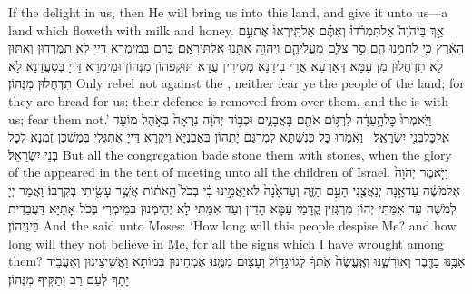 {If the \lord\space delight in us, then He will bring us into this land, and give it unto us—a land which floweth with milk and honey.}{}
{אַ֣ךְ בַּיהֹוָה֮ אַל\maqqaf תִּמְרֹ֒דוּ֒ וְאַתֶּ֗ם אַל\maqqaf תִּֽירְאוּ֙ אֶת\maqqaf עַ֣ם הָאָ֔רֶץ כִּ֥י לַחְמֵ֖נוּ הֵ֑ם סָ֣ר צִלָּ֧ם מֵעֲלֵיהֶ֛ם וַֽיהֹוָ֥ה אִתָּ֖נוּ אַל\maqqaf תִּירָאֻֽם׃}
{בְּרַם בְּמֵימְרָא דַּייָ לָא תִמְרְדוּן וְאַתּוּן לָא תִדְחֲלוּן מִן עַמָּא דְּאַרְעָא אֲרֵי בִידַנָא מְסִירִין עֲדָא תּוּקְפְהוֹן מִנְּהוֹן וּמֵימְרָא דַּייָ בְּסַעֲדַנָא לָא תִדְחֲלוּן מִנְּהוֹן׃}
{Only rebel not against the \lord, neither fear ye the people of the land; for they are bread for us; their defence is removed from over them, and the \lord\space is with us; fear them not.’}{}
{וַיֹּֽאמְרוּ֙ כׇּל\maqqaf הָ֣עֵדָ֔ה לִרְגּ֥וֹם אֹתָ֖ם בָּאֲבָנִ֑ים וּכְב֣וֹד יְהֹוָ֗ה נִרְאָה֙ בְּאֹ֣הֶל מוֹעֵ֔ד אֶֽל\maqqaf כׇּל\maqqaf בְּנֵ֖י יִשְׂרָאֵֽל׃ \petucha }
{וַאֲמַרוּ כָּל כְּנִשְׁתָּא לְמִרְגַּם יָתְהוֹן בְּאַבְנַיָּא וִיקָרָא דַּייָ אִתְגְּלִי בְּמַשְׁכַּן זִמְנָא לְכָל בְּנֵי יִשְׂרָאֵל׃}
{But all the congregation bade stone them with stones, when the glory of the \lord\space appeared in the tent of meeting unto all the children of Israel.}{}
{וַיֹּ֤אמֶר יְהֹוָה֙ אֶל\maqqaf מֹשֶׁ֔ה עַד\maqqaf אָ֥נָה יְנַאֲצֻ֖נִי הָעָ֣ם הַזֶּ֑ה וְעַד\maqqaf אָ֙נָה֙ לֹא\maqqaf יַאֲמִ֣ינוּ בִ֔י בְּכֹל֙ הָֽאֹת֔וֹת אֲשֶׁ֥ר עָשִׂ֖יתִי בְּקִרְבּֽוֹ׃}
{וַאֲמַר יְיָ לְמֹשֶׁה עַד אִמַּתִּי יְהוֹן מַרְגְּזִין קֳדָמַי עַמָּא הָדֵין וְעַד אִמַּתִּי לָא יְהֵימְנוּן בְּמֵימְרִי בְּכֹל אָתַיָּא דַּעֲבַדִית בֵּינֵיהוֹן׃}
{And the \lord\space said unto Moses: ‘How long will this people despise Me? and how long will they not believe in Me, for all the signs which I have wrought among them?}{}
{אַכֶּ֥נּוּ בַדֶּ֖בֶר וְאוֹרִשֶׁ֑נּוּ וְאֶֽעֱשֶׂה֙ אֹֽתְךָ֔ לְגוֹי\maqqaf גָּד֥וֹל וְעָצ֖וּם מִמֶּֽנּוּ׃}
{אֶמְחֵינוּן בְּמוֹתָא וַאֲשֵׁיצֵינוּן וְאַעֲבֵיד יָתָךְ לְעַם רַב וְתַקִּיף מִנְּהוֹן׃}
